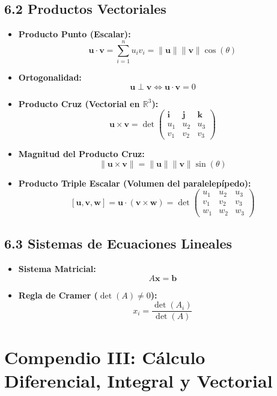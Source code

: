 \documentclass[11pt,a4paper]{article}
\begin{document}
\subsection*{6.2 Productos Vectoriales}

\begin{itemize}
  \item \textbf{Producto Punto (Escalar):}
  \[
    \mathbf{u} \cdot \mathbf{v} = \sum_{i=1}^n u_i v_i = \|\mathbf{u}\| \|\mathbf{v}\| \cos(\theta)
  \]
  \item \textbf{Ortogonalidad:}
  \[
    \mathbf{u} \perp \mathbf{v} \iff \mathbf{u} \cdot \mathbf{v} = 0
  \]
  \item \textbf{Producto Cruz (Vectorial en $\mathbb{R}^3$):}
  \[
    \mathbf{u} \times \mathbf{v} = \det\begin{pmatrix} \mathbf{i} & \mathbf{j} & \mathbf{k} \\ u_1 & u_2 & u_3 \\ v_1 & v_2 & v_3 \end{pmatrix}
  \]
  \item \textbf{Magnitud del Producto Cruz:}
  \[
    \|\mathbf{u} \times \mathbf{v}\| = \|\mathbf{u}\| \|\mathbf{v}\| \sin(\theta)
  \]
  \item \textbf{Producto Triple Escalar (Volumen del paralelepípedo):}
  \[
    [\mathbf{u}, \mathbf{v}, \mathbf{w}] = \mathbf{u} \cdot (\mathbf{v} \times \mathbf{w}) = \det\begin{pmatrix} u_1 & u_2 & u_3 \\ v_1 & v_2 & v_3 \\ w_1 & w_2 & w_3 \end{pmatrix}
  \]
\end{itemize}

\subsection*{6.3 Sistemas de Ecuaciones Lineales}

\begin{itemize}
  \item \textbf{Sistema Matricial:}
  \[
    A\mathbf{x} = \mathbf{b}
  \]
  \item \textbf{Regla de Cramer ($\det(A) \ne 0$):}
  \[
    x_i = \frac{\det(A_i)}{\det(A)}
  \]
\end{itemize}

\section*{Compendio III: Cálculo Diferencial, Integral y Vectorial}
\end{document}
